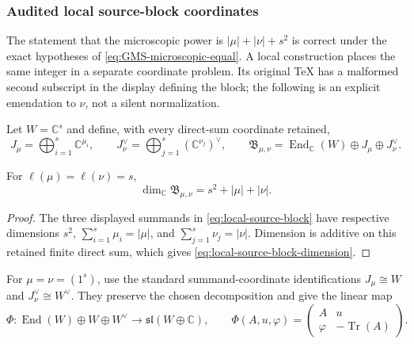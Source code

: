 \subsubsection{Audited local source-block coordinates}

The statement that the microscopic power is $|\mu|+|\nu|+s^2$ is correct under the exact
hypotheses of \eqref{eq:GMS-microscopic-equal}.  A local construction places the same integer
in a separate coordinate problem.  Its original TeX has a malformed second subscript in the
display defining the block; the following is an explicit emendation to $\nu$, not a silent
normalization.

Let $W=\mathbb C^s$ and define, with every direct-sum coordinate retained,
\begin{equation}
 J_\mu=\bigoplus_{i=1}^{s}\mathbb C^{\mu_i},
 \qquad
 J_\nu^\vee=\bigoplus_{j=1}^{s}(\mathbb C^{\nu_j})^\vee,
 \qquad
 \mathfrak B_{\mu,\nu}=\operatorname{End}_{\mathbb C}(W)\oplus J_\mu\oplus J_\nu^\vee.
 \label{eq:local-source-block}
\end{equation}

\begin{proposition}
\label{prop:local-source-block-dimension}
For $\ell(\mu)=\ell(\nu)=s$,
\begin{equation}
 \dim_{\mathbb C}\mathfrak B_{\mu,\nu}=s^2+|\mu|+|\nu|.
 \label{eq:local-source-block-dimension}
\end{equation}
\end{proposition}
\begin{proof}
The three displayed summands in \eqref{eq:local-source-block} have respective dimensions
$s^2$, $\sum_{i=1}^{s}\mu_i=|\mu|$, and
$\sum_{j=1}^{s}\nu_j=|\nu|$.  Dimension is additive on this retained finite direct sum, which
gives \eqref{eq:local-source-block-dimension}.
\end{proof}

For $\mu=\nu=(1^s)$, use the standard summand-coordinate identifications
$J_\mu\cong W$ and $J_\nu^\vee\cong W^\vee$.  They preserve the chosen decomposition and give
the linear map
\begin{equation}
 \Phi:\operatorname{End}(W)\oplus W\oplus W^\vee
 \longrightarrow\mathfrak{sl}(W\oplus\mathbb C),
 \qquad
 \Phi(A,u,\varphi)=
 \begin{pmatrix}A&u\\ \varphi&-\operatorname{Tr}(A)\end{pmatrix}.
 \label{eq:local-block-candidate}
\end{equation}


